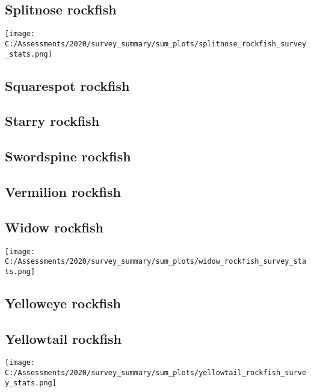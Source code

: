\documentclass[12pt,]{article}
\begin{document}
\FloatBarrier

\hypertarget{splitnose-rockfish}{%
\subsection{Splitnose rockfish}\label{splitnose-rockfish}}

\texttt{[image: C:/Assessments/2020/survey\_summary/sum\_plots/splitnose\_rockfish\_survey\_stats.png]}
\FloatBarrier  

\hypertarget{squarespot-rockfish}{%
\subsection{Squarespot rockfish}\label{squarespot-rockfish}}

\FloatBarrier

\hypertarget{starry-rockfish}{%
\subsection{Starry rockfish}\label{starry-rockfish}}

\FloatBarrier

\hypertarget{swordspine-rockfish}{%
\subsection{Swordspine rockfish}\label{swordspine-rockfish}}

\FloatBarrier

\hypertarget{vermilion-rockfish}{%
\subsection{Vermilion rockfish}\label{vermilion-rockfish}}

\FloatBarrier

\hypertarget{widow-rockfish}{%
\subsection{Widow rockfish}\label{widow-rockfish}}

\texttt{[image: C:/Assessments/2020/survey\_summary/sum\_plots/widow\_rockfish\_survey\_stats.png]}
\FloatBarrier  

\hypertarget{yelloweye-rockfish}{%
\subsection{Yelloweye rockfish}\label{yelloweye-rockfish}}

\FloatBarrier

\hypertarget{yellowtail-rockfish}{%
\subsection{Yellowtail rockfish}\label{yellowtail-rockfish}}

\texttt{[image: C:/Assessments/2020/survey\_summary/sum\_plots/yellowtail\_rockfish\_survey\_stats.png]}
\FloatBarrier  
\end{document}
